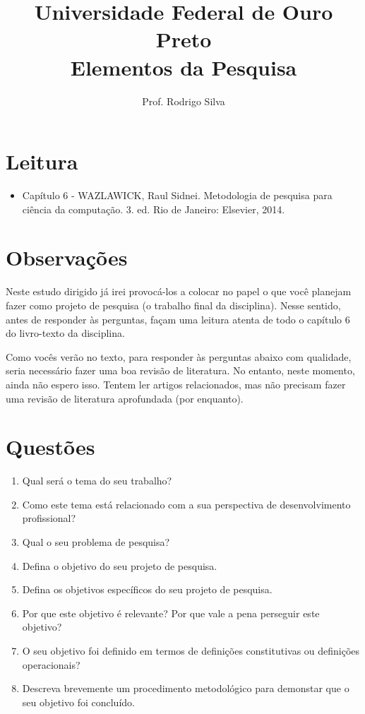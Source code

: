 \documentclass{article}
\title{\vspace{-2 cm}Universidade Federal de Ouro Preto \\ Elementos da Pesquisa}
\author{Prof. Rodrigo Silva}
\date{}
\begin{document}
\maketitle

\section{Leitura}

\begin{itemize}
    \item Capítulo 6 - WAZLAWICK, Raul Sidnei. Metodologia de pesquisa para ciência da computação. 3. ed. Rio de Janeiro: Elsevier, 2014.
\end{itemize}

\section{Observações}

Neste estudo dirigido já irei provocá-los a colocar no papel o que você planejam fazer como projeto de pesquisa (o trabalho final da disciplina). Nesse sentido, antes de responder às perguntas, façam uma leitura atenta de todo o capítulo 6 do livro-texto da disciplina.

Como vocês verão no texto, para responder às perguntas abaixo com qualidade, seria necessário fazer uma boa revisão de literatura. No entanto, neste momento, ainda não espero isso. Tentem ler artigos relacionados, mas não precisam fazer uma revisão de literatura aprofundada (por enquanto).

\section{Questões}

\begin{enumerate}
\item Qual será o tema do seu trabalho?
\item Como este tema está relacionado com a sua perspectiva de desenvolvimento profissional?
\item Qual o seu problema de pesquisa?
\item Defina o objetivo do seu projeto de pesquisa.
\item Defina os objetivos específicos do seu projeto de pesquisa.
\item Por que este objetivo é relevante? Por que vale a pena perseguir este objetivo?
\item O seu objetivo foi definido em termos de definições constitutivas ou definições operacionais?
\item Descreva brevemente um procedimento metodológico para demonstar que o seu objetivo foi concluído.

\end{enumerate}


%
%
\end{document}

